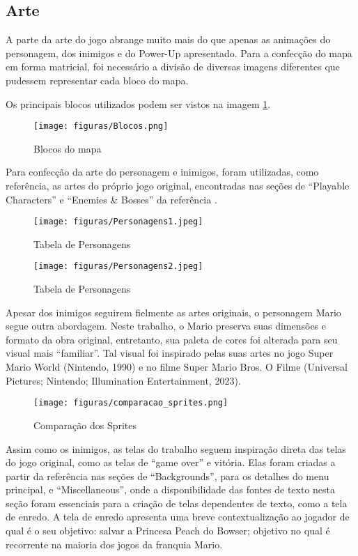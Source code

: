 \documentclass[11pt, twocolumn]{extarticle}
\begin{document}
\subsection{Arte}
\label{Artes}
\indent \indent A parte da arte do jogo abrange muito mais do que apenas as animações do personagem, dos inimigos e do Power-Up apresentado. Para a confecção do mapa em forma matricial, foi necessário a divisão de diversas imagens diferentes que pudessem representar cada bloco do mapa.

Os principais blocos utilizados podem ser vistos na imagem \ref{image: Blocos do mapa}.

\begin{figure}[H]
	\centering
	\texttt{[image: figuras/Blocos.png]}
	\caption{Blocos do mapa}
	\label{image: Blocos do mapa}
\end{figure}

Para confecção da arte do personagem e inimigos, foram utilizadas, como referência, as artes do próprio jogo original, encontradas nas seções de “Playable Characters” e “Enemies \& Bosses” da referência \cite{Sprites}. 

\begin{figure}[H]
	\centering
	\texttt{[image: figuras/Personagens1.jpeg]}
	\caption{Tabela de Personagens}
	\label{image: Tabela de Personagens1}
\end{figure}

\begin{figure}[H]
	\centering
	\texttt{[image: figuras/Personagens2.jpeg]}
	\caption{Tabela de Personagens}
	\label{image: Tabela de Personagens2}
\end{figure}

Apesar dos inimigos seguirem fielmente as artes originais, o personagem Mario segue outra abordagem. Neste trabalho, o Mario preserva suas dimensões e formato da obra original, entretanto, sua paleta de cores foi alterada para seu visual mais “familiar”. Tal visual foi inspirado pelas suas artes no jogo Super Mario World (Nintendo, 1990) e no filme Super Mario Bros. O Filme (Universal Pictures; Nintendo; Illumination Entertainment, 2023).

\begin{figure}[H]
	\centering
	\texttt{[image: figuras/comparacao\_sprites.png]}
	\caption{Comparação dos Sprites}
	\label{image: Comparacao dos Sprites}
\end{figure}

Assim como os inimigos, as telas do trabalho seguem inspiração direta das telas do jogo original, como as telas de “game over” e vitória. Elas foram criadas a partir da referência \cite{Sprites} nas seções de “Backgrounds”, para os detalhes do menu principal, e “Miscellaneous”, onde a disponibilidade das fontes de texto nesta seção foram essenciais para a criação de telas dependentes de texto, como a tela de enredo. A tela de enredo apresenta uma breve contextualização ao jogador de qual é o seu objetivo: salvar a Princesa Peach do Bowser; objetivo no qual é recorrente na maioria dos jogos da franquia Mario.
\end{document}
